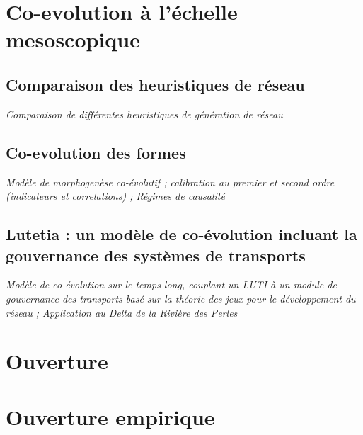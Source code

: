 \section{Co-evolution à l'échelle mesoscopique}


\subsection{Comparaison des heuristiques de réseau}

\textit{Comparaison de différentes heuristiques de génération de réseau}


\subsection{Co-evolution des formes}

\textit{Modèle de morphogenèse co-évolutif ; calibration au premier et second ordre (indicateurs et correlations) ; Régimes de causalité}



\subsection{Lutetia : un modèle de co-évolution incluant la gouvernance des systèmes de transports}


\textit{Modèle de co-évolution sur le temps long, couplant un LUTI à un module de gouvernance des transports basé sur la théorie des jeux pour le développement du réseau ; Application au Delta de la Rivière des Perles}







\section{Ouverture}




\section{Ouverture empirique}

